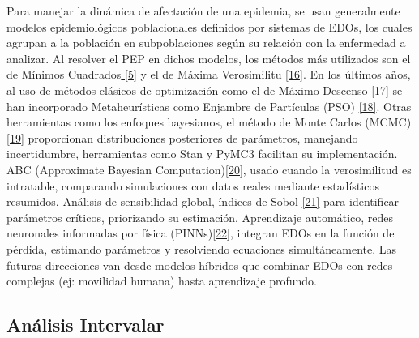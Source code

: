 \documentclass{article}
\begin{document}
    Para manejar la dinámica de afectación de una epidemia, se usan generalmente modelos epidemiológicos poblacionales definidos por sistemas de EDOs,
    los cuales agrupan a la población en subpoblaciones según su relación con la enfermedad a analizar. Al resolver el PEP en dichos modelos, los métodos
    más utilizados son el de Mínimos Cuadrados\hyperref[sec:5]{ [5]} y el de Máxima Verosimilitu \hyperref[sec:27]{[16]}. En los últimos años, al uso de métodos clásicos
    de optimización como el de Máximo Descenso \hyperref[sec:27]{[17]} se han incorporado Metaheurísticas como Enjambre de Partículas (PSO) \hyperref[sec:28]{[18]}. Otras herramientas como los enfoques bayesianos, el método de Monte
    Carlos (MCMC) \hyperref[sec:29]{[19]} proporcionan distribuciones posteriores de parámetros, manejando incertidumbre, herramientas como Stan y PyMC3 facilitan su implementación.
    ABC (Approximate Bayesian Computation)\hyperref[sec:30]{[20]}, usado cuando la verosimilitud es intratable, comparando simulaciones con datos reales mediante estadísticos resumidos.
    Análisis de sensibilidad global, índices de Sobol \hyperref[sec:31]{[21]} para identificar parámetros críticos, priorizando su estimación. Aprendizaje automático, redes neuronales
    informadas por física (PINNs)\hyperref[sec:32]{[22]}, integran EDOs en la función de pérdida, estimando parámetros y resolviendo ecuaciones simultáneamente. Las futuras direcciones van desde modelos híbridos que combinar EDOs con redes
    complejas (ej: movilidad humana) hasta aprendizaje profundo.

    \subsection*{ \Large Análisis Intervalar}
\end{document}
